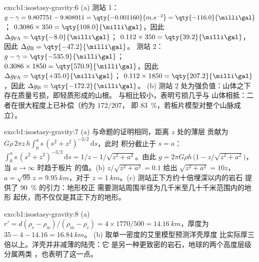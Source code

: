\begin{solution}{exo:b1:isostasy-gravity:6}
(a) 测站 1：$g - \gamma = 9.807751 - 9.808911 = \qty{-0.001160}{m.s^{-2}} =
\qty{-116.0}{\milli\gal}$； $0.3086\times350 =
\qty{108.0}{\milli\gal}$，因此 $\Delta g_{\mathrm{FA}} = \qty{-8.0}{\milli\gal}$；
 $0.112\times350 = \qty{39.2}{\milli\gal}$，因此
$\Delta g_{\mathrm B} = \qty{-47.2}{\milli\gal}$。
测站 2：$g - \gamma = \qty{-535.9}{\milli\gal}$；
$0.3086\times1850 = \qty{570.9}{\milli\gal}$，因此 $\Delta g_{\mathrm{FA}} =
\qty{+35.0}{\milli\gal}$； $0.112\times1850 =
\qty{207.2}{\milli\gal}$，因此 $\Delta g_{\mathrm B} = \qty{-172.2}{\milli\gal}$。
(b) 测站 2 处为强负值：山体之下
存在质量亏损，即轻质形成的山根。
与相比较小，表明亏损几乎与
山体相抵：二者在很大程度上已补偿（约为 $172/207$，
即 \qty{83}{\percent}，若板片模型对整个山脉成立）。
\end{solution}

\begin{solution}{exo:b1:isostasy-gravity:7}
(a) 与命题的证明相同，距离 $z$ 处的薄层
贡献为 $G\rho\,2\pi z\,h\int_0^a s\,(s^2 + z^2)^{-3/2}\,\mathrm ds$，此时
积分截止于 $s = a$：
$\int_0^a s\,(s^2 + z^2)^{-3/2}\,\mathrm ds = 1/z - 1/\sqrt{z^2 + a^2}$。由此
$g = 2\pi G\rho h\,\bigl(1 - z/\sqrt{z^2 + a^2}\bigr)$，当 $a \to \infty$ 时趋于板片
的值。(b) $z/\sqrt{z^2 + a^2} = 0.1$ 给出
$\sqrt{z^2 + a^2} = 10z$，$a = \sqrt{99}\,z = \qty{9.95}{km}$，对于
$z = \qty{1}{km}$。(c) 测站正下方约十倍埋深以内的岩石
提供了 \qty{90}{\percent} 的引力：地形校正
需要测站周围半径为几千米至几十千米范围内的地形
起伏，而不仅仅是其正下方的地形。
\end{solution}

\begin{solution}{exo:b1:isostasy-gravity:8}
(a) $r' = d(\rho_c - \rho_w)/(\rho_m - \rho_c) = 4\times1770/500 =
\qty{14.16}{km}$，厚度为 $35 - 4 - 14.16 = \qty{16.84}{km}$。
(b) 取单一密度的艾里模型预测洋壳厚度
比实际厚三倍以上。洋壳并非减薄的陆壳：它
是另一种更致密的岩石，地球的两个高度层级分属两类
，也表明了这一点。
\end{solution}

